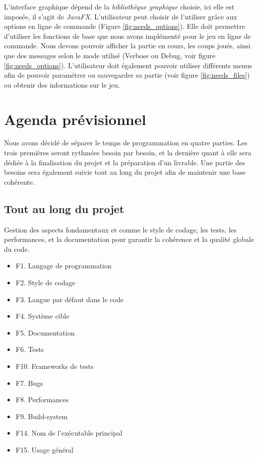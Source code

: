 \documentclass{article}
\begin{document}
L'interface graphique dépend de la \textit{bibliothèque graphique} choisie, ici elle est imposée, il s'agit de \textit{JavaFX}.
L'utilisateur peut choisir de l'utiliser grâce aux options en ligne de commande (Figure \ref{fig:needs_options}).
Elle doit permettre d'utiliser les fonctions de base que nous avons implémenté pour le jeu en ligne de commande. Nous devons 
pouvoir afficher la partie en cours, les coups joués, ainsi que des messages selon le mode utilisé (Verbose ou Debug, voir figure \ref{fig:needs_options}).
L'utilisateur doit également pouvoir utiliser différents menus afin de pouvoir paramétrer ou sauvegarder sa partie (voir figure \ref{fig:needs_files}) ou obtenir des informations sur le jeu.

\section{Agenda prévisionnel}
\label{agenda}

Nous avons décidé de séparer le temps de programmation en quatre parties. Les trois premières seront rythmées besoin par besoin, et la dernière quant à elle sera dédiée à la finalisation du projet et la préparation d'un livrable.
Une partie des besoins sera également suivie tout au long du projet afin de maintenir une base cohérente.

\subsection{Tout au long du projet}

Gestion des aspects fondamentaux et comme le style de codage, les tests, les performances, et la documentation pour garantir la cohérence et la qualité globale du code.

\begin{itemize}
    \item F1. Langage de programmation
    \item F2. Style de codage
    \item F3. Langue par défaut dans le code
    \item F4. Système cible
    \item F5. Documentation
    \item F6. Tests
    \item F10. Frameworks de tests
    \item F7. Bugs
    \item F8. Performances
    \item F9. Build-system
    \item F14. Nom de l'exécutable principal
    \item F15. Usage général
\end{itemize}
\end{document}
